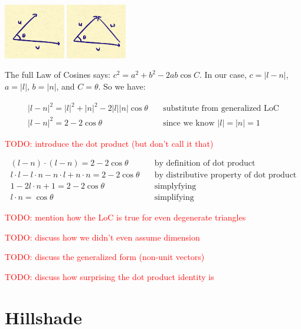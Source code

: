 \documentclass{article}
\newcommand\todo[1]{\textcolor{red}{TODO: #1}}
\begin{document}
\begin{center}
	\includegraphics[width=0.2\textwidth,frame]{assets/uv.jpg}
	\hspace{0.2\textwidth}
	\includegraphics[width=0.197\textwidth,frame]{assets/uvw.jpg}
\end{center}

The full Law of Cosines says: $c^2 = a^2 + b^2 - 2ab \cos C$.
In our case, $c = | l - n |$, $a = |l|$, $b = |n|$, and $C = \theta$.
So we have:

\begin{align*}
|l-n|^2 = |l|^2 + |n|^2 - 2 |l| |n| \cos \theta & \quad \text{substitute from generalized LoC} \\
|l-n|^2 = 2 - 2 \cos \theta & \quad \text{since we know } |l| = |n| = 1
\end{align*}

\todo{introduce the dot product (but don't call it that)}

\begin{align*}
(l - n) \cdot (l - n) = 2 - 2 \cos \theta & \quad \text{by definition of dot product} \\
l \cdot l - l \cdot n - n \cdot l + n \cdot n = 2 - 2 \cos \theta & \quad \text{by distributive property of dot product} \\
1 - 2 l \cdot n + 1 = 2 - 2 \cos \theta & \quad \text{simplyfying} \\
l \cdot n = \cos \theta & \quad \text{simplifying}
\end{align*}

\todo{mention how the LoC is true for even degenerate triangles}

\todo{discuss how we didn't even assume dimension}

\todo{discuss the generalized form (non-unit vectors)}

\todo{discuss how surprising the dot product identity is}

\section{Hillshade}
\end{document}
